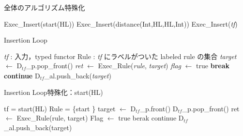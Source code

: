 \begin{algorithm}
    \caption{全体のアルゴリズム特殊化}
\begin{algorithmic}
    \scriptsize
        \State Exec\_Insert(start(HL))
        \State Exec\_Insert(distance(Int,HL,HL,Int))
            \State Exec\_Insert(\textit{tf})
        \EndWhile
    \EndProcedure
\end{algorithmic}
\end{algorithm}

\begin{algorithm}
    \caption{Insertion Loop}
\begin{algorithmic}
    \scriptsize
    \Require \textit{tf} : 入力，typed functor
    \Require Rule : \textit{tf} にラベルがついた labeled rule の集合
            \State \textit{target} $\gets$ $\text{D}_\mathit{tf}$\_p.pop\_front()
                \State \textit{ret} $\gets$ Exec\_Rule(\textit{rule}, \textit{target})
                 
                    \State \textit{flag} $\gets$ true
                    \State \textbf{break}
                \EndIf
            \EndFor
                \State \textbf{continue}
            \EndIf
            \State $\text{D}_\mathit{tf}$\_al.push\_back(\textit{target})
        \EndWhile
    \EndProcedure
\end{algorithmic}
\end{algorithm}

\begin{algorithm}
    \caption{Insertion Loop特殊化：start(HL)}
\begin{algorithmic}
    \scriptsize
    \Require tf = start(HL)
    \Require Rule = \{start \}
            \State target $\gets$  $\text{D}_{tf}$\_p.front()
            \State $\text{D}_{tf}$\_p.pop\_front()
             
                \State ret $\gets$ Exec\_Rule(rule, target)
                 
                    \State Flag $\gets$ true
                    \State berak
                \EndIf
            \EndFor
                \State continue
            \EndIf
            \State $\text{D}_{tf}$\_al.push\_back(target)
        \EndWhile
    \EndProcedure
\end{algorithmic}
\end{algorithm}

